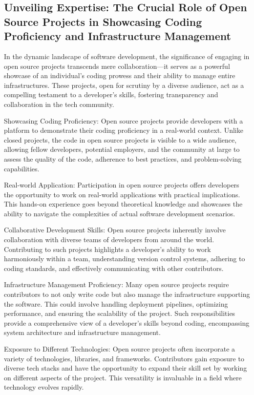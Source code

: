 \documentclass[
    a4paper, %
    10pt, %
    unnumberedsections, %
    twoside, %
]{LTJournalArticle}
\begin{document}
\subsection{Unveiling Expertise: The Crucial Role of Open Source Projects in Showcasing Coding Proficiency and Infrastructure Management}

In the dynamic landscape of software development, the significance of engaging in open source projects transcends mere collaboration—it serves as a powerful showcase of an individual's coding prowess and their ability to manage entire infrastructures. These projects, open for scrutiny by a diverse audience, act as a compelling testament to a developer's skills, fostering transparency and collaboration in the tech community.

Showcasing Coding Proficiency:
Open source projects provide developers with a platform to demonstrate their coding proficiency in a real-world context. Unlike closed projects, the code in open source projects is visible to a wide audience, allowing fellow developers, potential employers, and the community at large to assess the quality of the code, adherence to best practices, and problem-solving capabilities.

Real-world Application:
Participation in open source projects offers developers the opportunity to work on real-world applications with practical implications. This hands-on experience goes beyond theoretical knowledge and showcases the ability to navigate the complexities of actual software development scenarios.

Collaborative Development Skills:
Open source projects inherently involve collaboration with diverse teams of developers from around the world. Contributing to such projects highlights a developer's ability to work harmoniously within a team, understanding version control systems, adhering to coding standards, and effectively communicating with other contributors.

Infrastructure Management Proficiency:
Many open source projects require contributors to not only write code but also manage the infrastructure supporting the software. This could involve handling deployment pipelines, optimizing performance, and ensuring the scalability of the project. Such responsibilities provide a comprehensive view of a developer's skills beyond coding, encompassing system architecture and infrastructure management.

Exposure to Different Technologies:
Open source projects often incorporate a variety of technologies, libraries, and frameworks. Contributors gain exposure to diverse tech stacks and have the opportunity to expand their skill set by working on different aspects of the project. This versatility is invaluable in a field where technology evolves rapidly.
\end{document}
